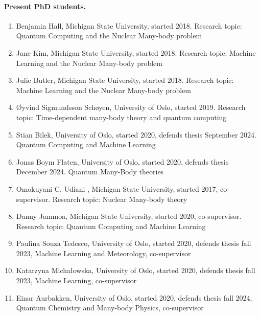\documentclass[%
oneside,                 %
final,                   %
10pt]{article}
\begin{document}
\paragraph{Present PhD students.}
\begin{enumerate}
\item Benjamin Hall, Michigan State University, started 2018. Research topic: Quantum Computing  and the Nuclear Many-body problem

\item Jane Kim, Michigan State University, started 2018. Research topic: Machine Learning and the Nuclear Many-body problem

\item Julie Butler, Michigan State University, started 2018. Research topic: Machine Learning and the Nuclear Many-body problem

\item Øyvind Sigmundsson Schøyen, University of Oslo, started 2019. Research topic: Time-dependent many-body theory and quantum computing

\item Stian Bilek, University of Oslo, started 2020, defends thesis September 2024. Quantum Computing  and Machine Learning

\item Jonas Boym Flaten, University of Oslo, started 2020, defends thesis December 2024. Quantum Many-Body theories

\item Omokuyani C. Udiani , Michigan State University, started 2017, co-supervisor. Research topic: Nuclear Many-body theory

\item Danny Jammoa, Michigan State University, started 2020, co-supervisor. Research topic: Quantum Computing and Machine Learning

\item Paulina Souza Tedesco, University of Oslo, started 2020, defends thesis fall 2023, Machine Learning and Meteorology, co-supervisor

\item Katarzyna Michałowska, University of Oslo, started 2020, defends thesis fall 2023, Machine Learning, co-supervisor

\item Einar Aurbakken, University of Oslo, started 2020, defends thesis fall 2024, Quantum Chemistry and Many-body Physics, co-supervisor
\end{enumerate}
\end{document}

